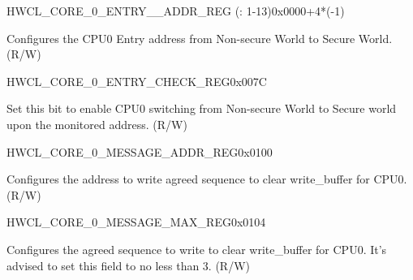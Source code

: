 \begin{register}{H}{WCL\_CORE\_0\_ENTRY\_\_ADDR\_REG (: 1-13)}{0x{}0000+4*(-1)}\label{regdesc:WCLCORE0ENTRYnADDRREG}
%
\regnewline%
\begin{regdesc}\begin{reglist}
\label{fielddesc:WCLCORE0ENTRY1ADDR}\item [WCL\_CORE\_0\_ENTRY\_\regindex{n}\_ADDR] Configures the CPU0 Entry  address from Non-secure World to Secure World. (R/W)
\end{reglist}\end{regdesc}
\end{register}


\begin{register}{H}{WCL\_CORE\_0\_ENTRY\_CHECK\_REG}{0x{}007C}\label{regdesc:WCLCORE0ENTRYCHECKREG}
%
%
%
\regnewline%
\begin{regdesc}\begin{reglist}
\label{fielddesc:WCLCORE0ENTRYCHECK}\item [WCL\_CORE\_0\_ENTRY\_CHECK] Set this bit to enable CPU0 switching from Non-secure World to Secure world upon the monitored address. (R/W)
\end{reglist}\end{regdesc}
\end{register}


\begin{register}{H}{WCL\_CORE\_0\_MESSAGE\_ADDR\_REG}{0x{}0100}\label{regdesc:WCLCORE0MESSAGEADDRREG}
%
\regnewline%
\begin{regdesc}\begin{reglist}
\label{fielddesc:WCLCORE0MESSAGEADDR}\item [WCL\_CORE\_0\_MESSAGE\_ADDR] Configures the address to write agreed sequence to clear write\_buffer for CPU0. (R/W)
\end{reglist}\end{regdesc}
\end{register}


\begin{register}{H}{WCL\_CORE\_0\_MESSAGE\_MAX\_REG}{0x{}0104}\label{regdesc:WCLCORE0MESSAGEMAXREG}
%
%
\regnewline%
\begin{regdesc}\begin{reglist}
\label{fielddesc:WCLCORE0MESSAGEMAX}\item [WCL\_CORE\_0\_MESSAGE\_MAX] Configures the agreed sequence to write to clear write\_buffer for CPU0. It's advised to set this field to no less than 3. (R/W)
\end{reglist}\end{regdesc}
\end{register}


